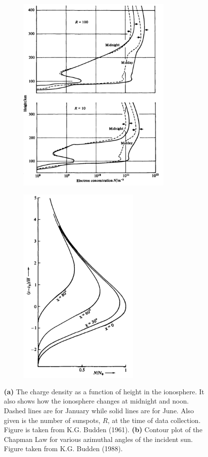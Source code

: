 \documentclass[11pt]{article}
\numberwithin{equation}{section}
\begin{document}
\begin{figure}[ht]
 \begin{center}
 \begin{subfigure}[b]{0.44\textwidth}
    \includegraphics[width = 3in]{figs/structure_iono.png}
         \caption{}
    \label{fig:struct_ion} 
 \end{subfigure}
\qquad
 \begin{subfigure}[b]{0.44\textwidth}
         \includegraphics[width = 2.35in]{figs/chapman.png}
          \caption{ }
     \label{fig:chapman}
 \end{subfigure}
 \end{center}
 \caption{\textbf{(a)} The charge density as a function of height in the ionosphere. It also shows how the ionosphere changes at midnight and noon. Dashed lines are for January while solid lines are for June. Also given is the number of sunspots, $R$, at the time of data collection.  Figure is taken from K.G. Budden (1961).\cite{budden1988propagation} \textbf{(b)} Contour plot of the Chapman Law for various azimuthal angles of the incident sun. Figure taken from K.G. Budden (1988).\cite{budden1988propagation} }
 \label{fig:elect_density}
\end{figure}
\end{document}
